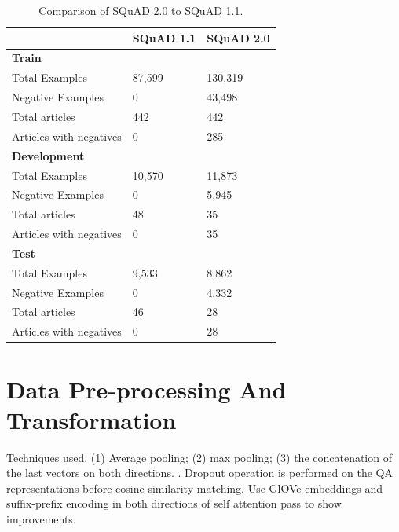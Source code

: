 \documentclass[a4paper,12pt]{report}
\begin{document}
		\begin{table}[h!]
		              \centering
		                \begin{tabular}{|l|l|l|}
		                    \hline
		                     & SQuAD 1.1 &  SQuAD 2.0 \\
		                    \hline
		                    \textbf{Train} & & \\
		                        Total Examples & 87,599 &  130,319 \\
		                        Negative Examples & 0 & 43,498 \\
		                        Total articles & 442 & 442 \\
		                        Articles with negatives & 0 & 285 \\
		                    \hline
		                    \textbf{Development} & & \\
		                        Total Examples & 10,570 &  11,873 \\
		                        Negative Examples & 0 & 5,945 \\
		                        Total articles & 48 & 35 \\
		                        Articles with negatives & 0 & 35 \\
		                    \hline
		                    \textbf{Test} &  & \\
		                        Total Examples & 9,533 & 8,862 \\
		                        Negative Examples & 0 & 4,332 \\
		                        Total articles & 46 & 28 \\
		                        Articles with negatives & 0 & 28 \\
		                    \hline
		                \end{tabular}
		                \caption{Comparison of  SQuAD 2.0 to SQuAD 1.1\citep{dataset}.}\label{datasetDescription}
		 \end{table}

    \section{Data Pre-processing And Transformation}\label{c32}
    Techniques used.
    (1) Average pooling; (2) max pooling; (3) the concatenation of the last vectors on both directions. . Dropout operation is performed on the QA representations before cosine similarity matching. Use GlOVe embeddings and suffix-prefix encoding in both directions of self attention pass to show improvements.
\end{document}
